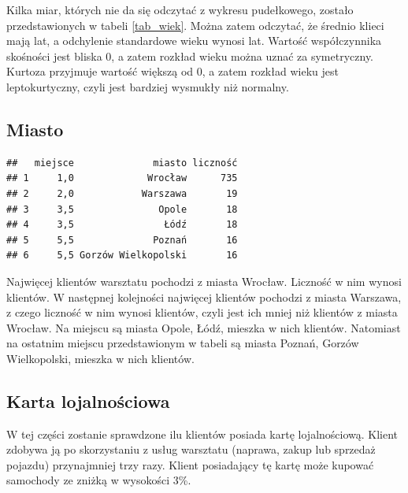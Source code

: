 \documentclass{article}\usepackage[]{graphicx}\usepackage[]{xcolor}
\makeatletter
\newenvironment{kframe}{%
 \def\at@end@of@kframe{}%
 \ifinner\ifhmode%
  \def\at@end@of@kframe{\end{minipage}}%
  \begin{minipage}{\columnwidth}%
 \fi\fi%
 \def\FrameCommand##1{\hskip\@totalleftmargin \hskip-\fboxsep
 \colorbox{shadecolor}{##1}\hskip-\fboxsep
     \hskip-\linewidth \hskip-\@totalleftmargin \hskip\columnwidth}%
 \MakeFramed {\advance\hsize-\width
   \@totalleftmargin\z@ \linewidth\hsize
   \@setminipage}}%
 {\par\unskip\endMakeFramed%
 \at@end@of@kframe}
\newenvironment{knitrout}{}{} %
\makeatother
\begin{document}
Kilka miar, których nie da się odczytać z wykresu pudełkowego, zostało przedstawionych w tabeli \ref{tab_wiek}. Można zatem odczytać, że średnio klieci mają  lat, a odchylenie standardowe wieku wynosi  lat. Wartość współczynnika skośności jest bliska 0, a zatem rozkład wieku można uznać za symetryczny. Kurtoza przyjmuje wartość większą od 0, a zatem rozkład wieku jest leptokurtyczny, czyli jest bardziej wysmukły niż normalny.

\subsection{Miasto}
\begin{knitrout}
\color{fgcolor}\begin{kframe}
\begin{verbatim}
##   miejsce              miasto liczność
## 1     1,0             Wrocław      735
## 2     2,0            Warszawa       19
## 3     3,5               Opole       18
## 4     3,5                Łódź       18
## 5     5,5              Poznań       16
## 6     5,5 Gorzów Wielkopolski       16
\end{verbatim}
\end{kframe}
\end{knitrout}

Najwięcej klientów warsztatu pochodzi z miasta Wrocław. Liczność w nim wynosi  klientów. W następnej kolejności najwięcej klientów pochodzi z miasta Warszawa, z czego liczność w nim wynosi  klientów, czyli jest ich  mniej niż klientów z miasta Wrocław. Na miejscu  są miasta Opole, Łódź, mieszka w nich  klientów. Natomiast na ostatnim miejscu przedstawionym w tabeli są miasta Poznań, Gorzów Wielkopolski, mieszka w nich  klientów.

\subsection{Karta lojalnościowa}

W tej części zostanie sprawdzone ilu klientów posiada kartę lojalnościową. Klient zdobywa ją po skorzystaniu z usług warsztatu (naprawa, zakup lub sprzedaż pojazdu) przynajmniej trzy razy. Klient posiadający tę kartę może kupować samochody ze zniżką w wysokości 3\%.
\end{document}
